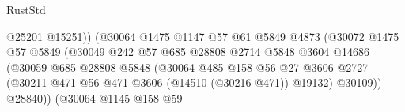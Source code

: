 \begin{lexlean}{RustStd}
\begin{coremodule}
                                                @25201
                                                @15251))
                                            (@30064
                                              @1475
                                              @1147
                                              @57
                                              @61
                                              @5849
                                              @4873
                                              (@30072
                                                @1475
                                                @57
                                                @5849
                                                (@30049
                                                  @242
                                                  @57
                                                  @685
                                                  @28808
                                                  @2714
                                                  @5848
                                                  @3604
                                                  @14686
                                                  (@30059
                                                    @685
                                                    @28808
                                                    @5848
                                                    (@30064
                                                      @485
                                                      @158
                                                      @56
                                                      @27
                                                      @3606
                                                      @2727
                                                      (@30211
                                                        @471
                                                        @56
                                                        @471
                                                        @3606
                                                        (@14510 (@30216 @471))
                                                        @19132)
                                                      @30109))
                                                  @28840))
                                              (@30064
                                                @1145
                                                @158
                                                @59

\end{coremodule}
\end{lexlean}
